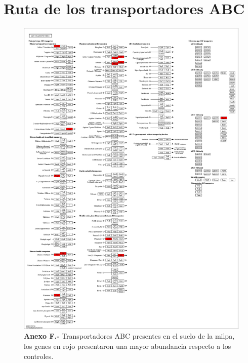 \documentclass[12pt,letterpaper,oneside]{report}
\begin{document}
\chapter{Ruta de los transportadores ABC}
\begin{figure}[!h]
\centering
\includegraphics[scale=0.2]{apendices/F-6}
\caption*{\textbf{Anexo F.-} Transportadores ABC presentes en el suelo de la milpa, los genes en rojo presentaron una mayor abundancia respecto a los controles.}
\end{figure}
\end{document}

